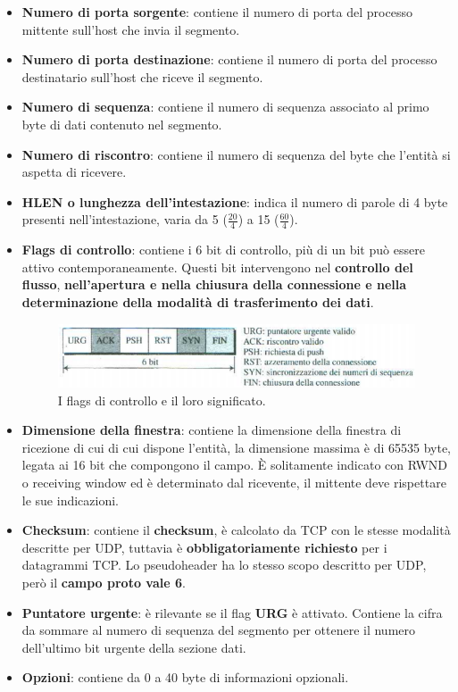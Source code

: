 \documentclass[11pt,a4paper,oneside]{book}
\theoremstyle{definition}
\begin{document}
\begin{itemize}
	\item \textbf{Numero di porta sorgente}: contiene il numero di porta del processo mittente sull'host che invia il segmento.
	\item \textbf{Numero di porta destinazione}: contiene il numero di porta del processo destinatario sull'host che riceve il segmento.
	\item \textbf{Numero di sequenza}: contiene il numero di sequenza associato al primo byte di dati contenuto nel segmento.
	\item \textbf{Numero di riscontro}: contiene il numero di sequenza del byte che l'entità si aspetta di ricevere.
	\item \textbf{HLEN o lunghezza dell'intestazione}: indica il numero di parole di 4 byte presenti nell'intestazione, varia da 5 ($\frac{20}{4}$) a 15 ($\frac{60}{4}$).
	\item \textbf{Flags di controllo}: contiene i 6 bit di controllo, più di un bit può essere attivo contemporaneamente. Questi bit intervengono nel \textbf{controllo del flusso}, \textbf{nell'apertura e nella chiusura della connessione e nella determinazione della modalità di trasferimento dei dati}.
	      \begin{figure}[!h]
		      \includegraphics[scale=0.5]{Immagini/TCP_flags.png}
		      \centering
		      \caption{I flags di controllo e il loro significato.}
	      \end{figure}
	\item \textbf{Dimensione della finestra}: contiene la dimensione della finestra di ricezione di cui di cui dispone l'entità, la dimensione massima è di 65535 byte, legata ai 16 bit che compongono il campo. È solitamente indicato con RWND o receiving window ed è determinato dal ricevente, il mittente deve rispettare le sue indicazioni.
	\item \textbf{Checksum}: contiene il \textbf{checksum}, è calcolato da TCP con le stesse modalità descritte per UDP, tuttavia è \textbf{obbligatoriamente richiesto} per i datagrammi TCP. Lo pseudoheader ha lo stesso scopo descritto per UDP, però il \textbf{campo proto vale 6}.
	\item \textbf{Puntatore urgente}: è rilevante se il flag \textbf{URG} è attivato. Contiene la cifra da sommare al numero di sequenza del segmento per ottenere il numero dell'ultimo bit urgente della sezione dati.
	\item \textbf{Opzioni}: contiene da 0 a 40 byte di informazioni opzionali.
\end{itemize}
\end{document}
